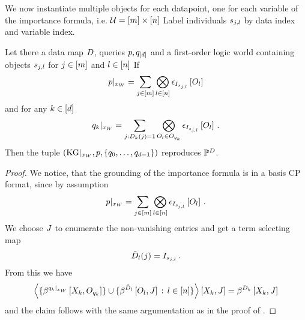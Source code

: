 %
We now instantiate multiple objects for each datapoint, one for each variable of the importance formula, i.e. $\mathcal{U}=[m]\times[n]$
Label individuals $s_{j,l}$ by data index and variable index.

\begin{lemma}
    Let there a data map $D$, queries $p,q_{[d]}$ and a first-order logic world containing objects $s_{j,l}$ for $j\in[m]$ and $l\in[n]$
    If
    \begin{align*}
        {p}|_{x_{W}}
        = \sum_{j\in[m]} \bigotimes_{l\in[n]} \epsilon_{I_{s_{j,l}}}\left[O_{l}\right]
    \end{align*}
    and for any $k\in[d]$
    \begin{align*}
        {q_{k}}|_{x_{W}}
        = \sum_{j : D_{k}(j)=1} \bigotimes_{O_{l} \in O_{q_{k}}}
        \epsilon_{I_{s_{j,l}}}\left[O_{l}\right] \, .
    \end{align*}
    Then the tuple $(\mathrm{KG}|_{x_{W}},p,\{q_{0},\ldots,q_{d-1}\})$ reproduces $\mathbb{P}^{D}$.
\end{lemma}
\begin{proof}
    We notice, that the grounding of the importance formula is in a basis CP format, since by assumption
    \begin{align*}
        {p}|_{x_{W}}
        = \sum_{j\in[m]} \bigotimes_{l\in[n]} \epsilon_{I_{s_{j,l}}}\left[O_{l}\right] \, .
    \end{align*}
    We choose $J$ to enumerate the non-vanishing entries and get a term selecting map
    \begin{align*}
        \tilde{D}_{l}(j) = I_{s_{j,l}} \, .
    \end{align*}
    From this we have
    \begin{align*}
        \left\langle 
            \{\beta^{{q_{k}}|_{x_{W}}}\left[X_{k},O_{q_{k}}\right]\} \cup
            \{\beta^{\tilde{D}_{l}}\left[O_{l},J\right] \, : \, l\in[n]\}
        \right\rangle \left[ X_{k},J \right]
        = \beta^{D_{k}}\left[X_{k},J\right]
    \end{align*}
    and the claim follows with the same argumentation as in the proof of .
\end{proof}


